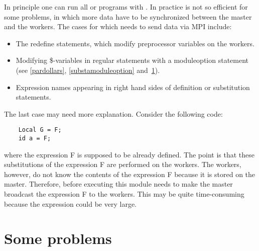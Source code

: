 In principle one can run all \FORM{} or \TFORM{} programs with \ParFORM{}.
In practice \ParFORM{} is not so efficient for some problems, in which
more data have to be synchronized between the master and the workers.
The cases for which \ParFORM{} needs to send data via MPI include:
\begin{itemize}
  \item The redefine statements, which modify preprocessor variables
        on the workers.
  \item Modifying \$-variables in regular statements with a moduleoption
        statement (see \ref{pardollars}, \ref{substamoduleoption}
        and~\ref{dollars-in-parallel}).
  \item Expression names appearing in right hand sides of definition or
        substitution statements.
\end{itemize}
The last case may need more explanation.
Consider the following code:
\begin{verbatim}
    Local G = F;
    id a = F;
\end{verbatim}
where the expression F is supposed to be already defined. The point is that 
these substitutions of the expression F are performed on the workers. The 
workers, however, do not know the contents of the expression F because it 
is stored on the master. Therefore, before executing this module \ParFORM{} 
needs to make the master broadcast the expression F to the workers. This 
may be quite time-consuming because the expression could be very large.


\section{Some problems}
\label{dollars-in-parallel}

